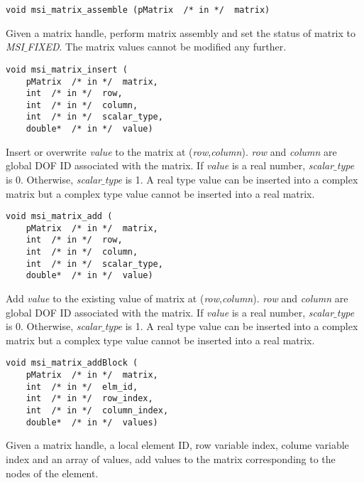 \begin{verbatim}
void msi_matrix_assemble (pMatrix  /* in */  matrix)
\end{verbatim}\vspace{-.5cm}\hspace{1cm}
Given a matrix handle, perform matrix assembly and set the status of matrix  to \textit{MSI$\_$FIXED}. 
The matrix values cannot be modified any further.

\begin{verbatim}
void msi_matrix_insert (
    pMatrix  /* in */  matrix, 
    int  /* in */  row, 
    int  /* in */  column, 
    int  /* in */  scalar_type,
    double*  /* in */  value)
\end{verbatim}\vspace{-.5cm}\hspace{1cm}
Insert or overwrite \textit{value} to the matrix at (\textit{row},\textit{column}).
\textit{row} and \textit{column} are global DOF ID associated with the matrix.
If \textit{value} is a real number, \textit{scalar$\_$type} is 0. Otherwise, \textit{scalar$\_$type} is 1. A real type value can be inserted into a complex matrix but a complex type value cannot be inserted into a real matrix.   

\begin{verbatim}
void msi_matrix_add (
    pMatrix  /* in */  matrix, 
    int  /* in */  row, 
    int  /* in */  column, 
    int  /* in */  scalar_type,
    double*  /* in */  value)
\end{verbatim}\vspace{-.5cm}\hspace{1cm}
Add \textit{value} to the existing value of matrix at (\textit{row},\textit{column}).
\textit{row} and \textit{column} are global DOF ID associated with the matrix.
If \textit{value} is a real number, \textit{scalar$\_$type} is 0. Otherwise, \textit{scalar$\_$type} is 1. A real type value can be inserted into a complex matrix but a complex type value cannot be inserted into a real matrix.  

\begin{verbatim}
void msi_matrix_addBlock (
    pMatrix  /* in */  matrix, 
    int  /* in */  elm_id, 
    int  /* in */  row_index, 
    int  /* in */  column_index, 
    double*  /* in */  values)
\end{verbatim}\vspace{-.5cm}\hspace{1cm}
Given a matrix handle, a local element ID, row variable index, colume variable index and an array of values, add values to the matrix corresponding to the nodes of the element. 
 
